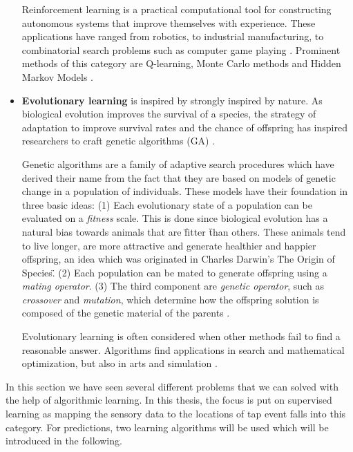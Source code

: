 \begin{itemize}
 Reinforcement learning is a practical computational tool for constructing autonomous systems that improve themselves with experience. These applications have ranged from robotics, to industrial manufacturing, to combinatorial search problems such
as computer game playing \cite{kaelbling1996reinforcement}. 
Prominent methods of this category are Q-learning, Monte Carlo
methods and Hidden Markov Models \cite{Marsland:2009:MLA:1571643}.\\

  \item[] \textbf{Evolutionary learning} is inspired by strongly inspired by nature. As biological evolution improves the survival of a species, the strategy of adaptation to improve survival rates and the chance of offspring has inspired researchers to craft genetic algorithms (GA) \cite{Marsland:2009:MLA:1571643}. 

Genetic algorithms are a family of adaptive search procedures which have derived their name from the fact that they are based on models of genetic change in a population of individuals. These models have their foundation in three basic ideas: (1) Each evolutionary state of a population can be evaluated on a \textit{fitness} scale. This is done since biological evolution has a natural bias towards animals that are \" fitter \" than others. These animals tend to live longer, are more attractive and generate healthier and happier offspring, an idea which was originated in Charles Darwin's \"The Origin of Species\". (2) Each population can be mated to generate offspring using a \textit{mating operator}. (3) The third component are \textit{genetic operator}, such as \textit{crossover} and \textit{mutation}, which determine how the offspring solution is composed of the genetic material of the parents \cite{de1988learning}.

Evolutionary learning is often considered when other methods fail to find a reasonable answer. Algorithms find applications in search and mathematical optimization, but also in arts and simulation \cite{Marsland:2009:MLA:1571643}.\\
\end{itemize}

In this section we have seen several different problems that we can solved with the help of algorithmic learning. In this thesis, the focus is put on supervised learning as mapping the sensory data to the locations of tap event falls into this category. For predictions, two learning algorithms will be used which will be introduced in the following.

